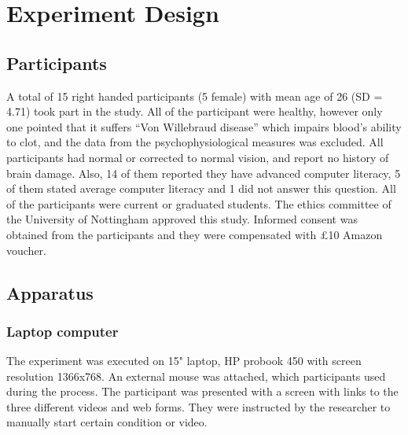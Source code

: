 \documentclass[../main/Feedback.tex]{subfiles}
\begin{document}
\section{Experiment Design}

\subsection{Participants}
A total of 15 right handed participants (5 female) with mean age of 26 (SD = 4.71) took part in the study. All of the participant were healthy, however only one pointed that it suffers ``Von Willebraud disease'' which impairs blood's ability to clot, and the data from the psychophysiological measures was excluded. All participants had normal or corrected to normal vision, and report no history of brain damage. Also, 14 of them reported they have advanced computer literacy, 5 of them stated average computer literacy and 1 did not answer this question. All of the participants were current or graduated students. The ethics committee of the University of Nottingham approved this study. Informed consent was obtained from the participants and they were compensated with £10 Amazon voucher.
\subsection{Apparatus}
\subsubsection{Laptop computer}
The experiment was executed on 15" laptop, HP probook 450 with screen resolution 1366x768. An external mouse was attached, which participants used during the process. The participant was presented with a screen with links to the three different videos and web forms. They were instructed by the researcher to manually start certain condition or video.
\end{document}
